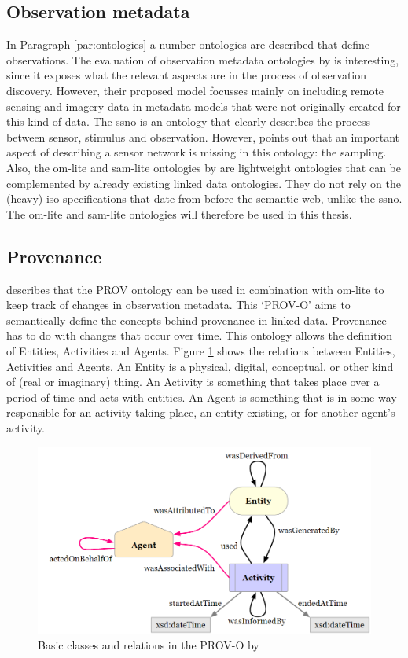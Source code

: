 \subsection{Observation metadata}
In Paragraph \ref{par:ontologies} a number ontologies are described that define observations. The evaluation of observation metadata ontologies by \cite{SW:Hu} is interesting, since it exposes what the relevant aspects are in the process of observation discovery. However, their proposed model focusses mainly on including remote sensing and imagery data in metadata models that were not originally created for this kind of data. The \ac{ssno} is an ontology that clearly describes the process between sensor, stimulus and observation. However, \cite{SSW:Cox4} points out that an important aspect of describing a sensor network is missing in this ontology: the sampling. Also, the om-lite and sam-lite ontologies by \cite{SSW:Cox4} are lightweight ontologies that can be complemented by already existing linked data ontologies. They do not rely on the (heavy) \ac{iso} specifications that date from before the semantic web, unlike the \ac{ssno}. The om-lite and sam-lite ontologies will therefore be used in this thesis. 

\subsection{Provenance}
\cite{SSW:Cox4} describes that the PROV ontology can be used in combination with om-lite to keep track of changes in observation metadata. This `PROV-O' aims to semantically define the concepts behind provenance in linked data. Provenance has to do with changes that occur over time. This ontology allows the definition of Entities, Activities and Agents. Figure \ref{fig:PROV} shows the relations between  Entities, Activities and Agents. An Entity is a physical, digital, conceptual, or other kind of (real or imaginary) thing. An Activity is something that takes place over a period of time and acts with entities. An Agent is something that is in some way responsible for an activity taking place, an entity existing, or for another agent's activity. 

\begin{figure}
	\centering
	\includegraphics[width=1\linewidth]{UML/PROV.png}
	\caption{Basic classes and relations in the PROV-O by \citep{LD:PROV}}
	\label{fig:PROV}
\end{figure}

